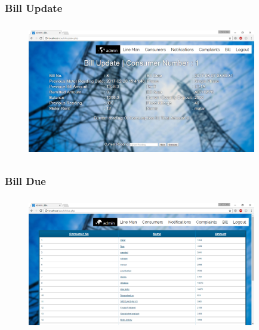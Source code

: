 \documentclass{beamer} %
\theoremstyle{definition} %
\begin{document}
\begin{frame}
\frametitle{Bill Update}
\begin{figure}[center]
\includegraphics[width=10cm ,height=5.9cm]{billupdate.png} 
\end{figure}
\end{frame}

\begin{frame}
\frametitle{Bill Due}
\begin{figure}[center]
\includegraphics[width=10cm ,height=5.9cm]{billdue.png} 
\end{figure}
\end{frame}
\end{document}
